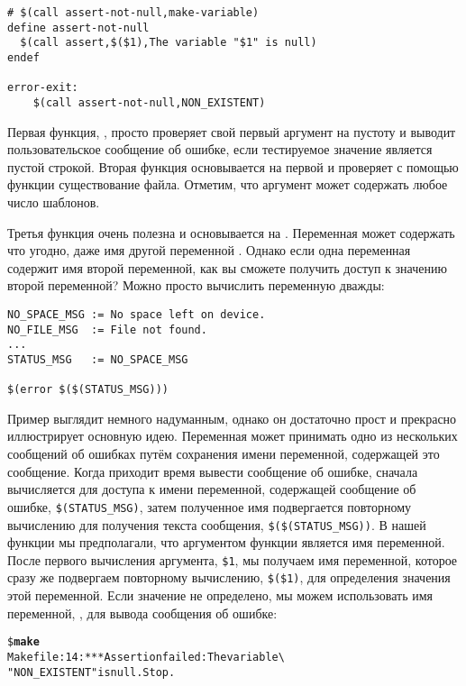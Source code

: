 \begin{description}
{\begin{verbatim}
# $(call assert-not-null,make-variable)
define assert-not-null
  $(call assert,$($1),The variable "$1" is null)
endef

error-exit:
    $(call assert-not-null,NON_EXISTENT)
\end{verbatim}
}

Первая функция, , просто проверяет свой первый
аргумент на пустоту и выводит пользовательское сообщение об ошибке,
если тестируемое значение является пустой строкой. Вторая функция
основывается на первой и проверяет с помощью функции
 существование файла. Отметим, что аргумент может
содержать любое число шаблонов.

Третья функция очень полезна и основывается на . Переменная \GNUmake{} может содержать что угодно,
даже имя другой переменной \GNUmake{}.  Однако если одна переменная
содержит имя второй переменной, как вы сможете получить доступ к
значению второй переменной? Можно просто вычислить переменную дважды:

{\footnotesize
\begin{verbatim}
NO_SPACE_MSG := No space left on device.
NO_FILE_MSG  := File not found.
...
STATUS_MSG   := NO_SPACE_MSG

$(error $($(STATUS_MSG)))
\end{verbatim}
}

Пример выглядит немного надуманным, однако он достаточно прост и
прекрасно иллюстрирует основную идею. Переменная
 может принимать одно из нескольких сообщений об
ошибках путём сохранения имени переменной, содержащей это сообщение.
Когда приходит время вывести сообщение об ошибке, сначала вычисляется
 для доступа к имени переменной, содержащей
сообщение об ошибке, \texttt{\${}(STATUS\_MSG)}, затем полученное имя
подвергается повторному вычислению для получения текста сообщения,
\texttt{\${}(\${}(STATUS\_MSG))}. В нашей функции
 мы предполагали, что аргументом функции
является имя переменной. После первого вычисления аргумента,
\texttt{\${}1}, мы получаем имя переменной, которое сразу же
подвергаем повторному вычислению, \texttt{\${}(\${}1)}, для
определения значения этой переменной. Если значение не определено, мы
можем использовать имя переменной, , для вывода
сообщения об ошибке:

{\footnotesize
\begin{alltt}
\${} \textbf{make}
Makefile:14: *** Assertion failed: The variable \textbackslash{}
"NON\_EXISTENT" is null. Stop.
\end{alltt}
}


\end{description}
